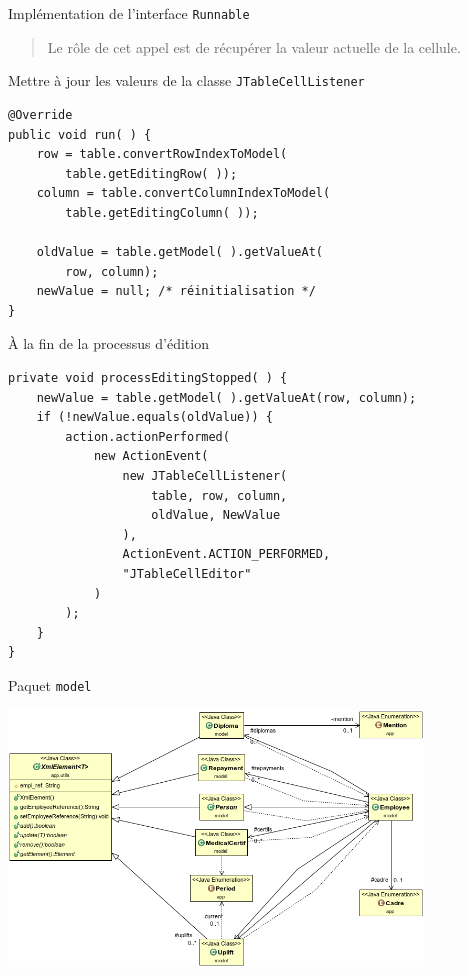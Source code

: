 \documentclass[captions=tableheading]{beamer}
\begin{document}
\begin{frame}[fragile,label={sec:org021bf22}]{Implémentation de l'interface \texttt{Runnable}}
 \begin{quote}
Le rôle de cet appel est de récupérer la valeur actuelle de la cellule.
\end{quote}
\begin{block}{Mettre à jour les valeurs de la classe \texttt{JTableCellListener}}
\begin{verbatim}
@Override
public void run( ) {
    row = table.convertRowIndexToModel(
        table.getEditingRow( ));
    column = table.convertColumnIndexToModel(
        table.getEditingColumn( ));

    oldValue = table.getModel( ).getValueAt(
        row, column);
    newValue = null; /* réinitialisation */
}
\end{verbatim}
\end{block}
\end{frame}

\begin{frame}[fragile,label={sec:org4b84e51}]{À la fin de la processus d'édition}
 \begin{verbatim}
private void processEditingStopped( ) {
    newValue = table.getModel( ).getValueAt(row, column);
    if (!newValue.equals(oldValue)) {
        action.actionPerformed(
            new ActionEvent(
                new JTableCellListener(
                    table, row, column,
                    oldValue, NewValue
                ),
                ActionEvent.ACTION_PERFORMED,
                "JTableCellEditor"
            )
        );
    }
}
\end{verbatim}
\end{frame}

\begin{frame}[fragile,label={sec:orgf4eca39}]{Paquet \texttt{model}}
 \begin{center}
\includegraphics[width=11cm]{./diags/classes.png}
\end{center}
\end{frame}
\end{document}
